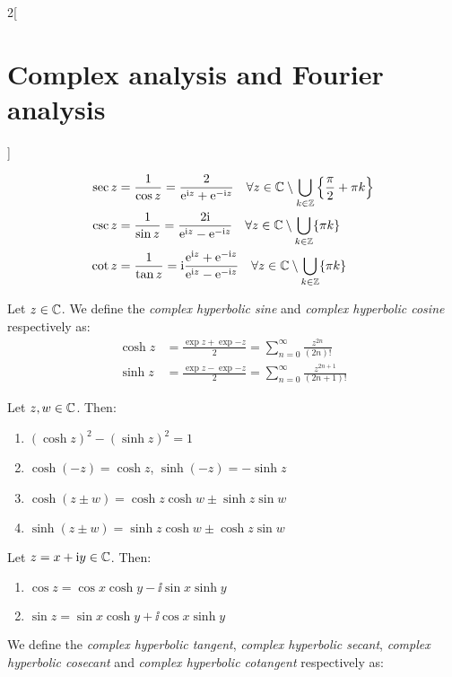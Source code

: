 \documentclass[../../../main.tex]{subfiles}
\begin{document}
\begin{multicols}{2}[\section{Complex analysis and Fourier analysis}]
\begin{definition}
\begin{align*}
      \sec z & = \frac{1}{\cos z}=\frac{2}{\mathrm{e}^{\mathrm{i} z}+\mathrm{e}^{-\mathrm{i} z}}\quad \forall z\in\mathbb{C}\setminus\bigcup_{k\in\mathbb{Z}}\left\{\frac{\pi}{2}+\pi k\right\}                                 \\
      \csc z & = \frac{1}{\sin z}=\frac{2\mathrm{i}}{\mathrm{e}^{\mathrm{i} z}-\mathrm{e}^{-\mathrm{i} z}}\quad\forall z\in\mathbb{C}\setminus\bigcup_{k\in\mathbb{Z}}\{\pi k\}                                                        \\
      \cot z & = \frac{1}{\tan z}=\mathrm{i}\frac{\mathrm{e}^{\mathrm{i} z}+\mathrm{e}^{-\mathrm{i} z}}{\mathrm{e}^{\mathrm{i} z}-\mathrm{e}^{-\mathrm{i} z}}\quad\forall z\in\mathbb{C}\setminus\bigcup_{k\in\mathbb{Z}}\{\pi k\}
    \end{align*}
  \end{definition}
  \begin{definition}
    Let $z\in \mathbb{C}$. We define the \emph{complex hyperbolic sine} and \emph{complex hyperbolic cosine} respectively as:
    \begin{align*}
      \cosh z & =\frac{\exp{z}+\exp{-z}}{2}=\sum_{n=0}^\infty\frac{z^{2n}}{(2n)!}     \\
      \sinh z & =\frac{\exp{z}-\exp{-z}}{2}=\sum_{n=0}^\infty\frac{z^{2n+1}}{(2n+1)!}
    \end{align*}
  \end{definition}
  \begin{proposition}
    Let $z,w\in\mathbb{C}$. Then:
    \begin{enumerate}
      \item ${\left(\cosh z\right)}^2-{\left(\sinh z\right)}^2=1$
      \item $\cosh(-z)=\cosh z$, $\sinh(-z)=-\sinh z$
      \item $\cosh{(z \pm w)} = \cosh z \cosh w \pm \sinh z \sin w$
      \item $\sinh{(z \pm w)} = \sinh z \cosh w \pm \cosh z \sin w$
    \end{enumerate}
  \end{proposition}
  \begin{proposition}
    Let $z=x+\mathrm{i} y\in \mathbb{C}$. Then:
    \begin{enumerate}
      \item $\cos z = \cos x \cosh y - \ii \sin x \sinh y$
      \item $\sin z = \sin x \cosh y + \ii \cos x \sinh y$
    \end{enumerate}
  \end{proposition}
  \begin{definition}
    We define the \emph{complex hyperbolic tangent}, \emph{complex hyperbolic secant}, \emph{complex hyperbolic cosecant} and \emph{complex hyperbolic cotangent} respectively as:

\end{definition}
\end{multicols}
\end{document}
